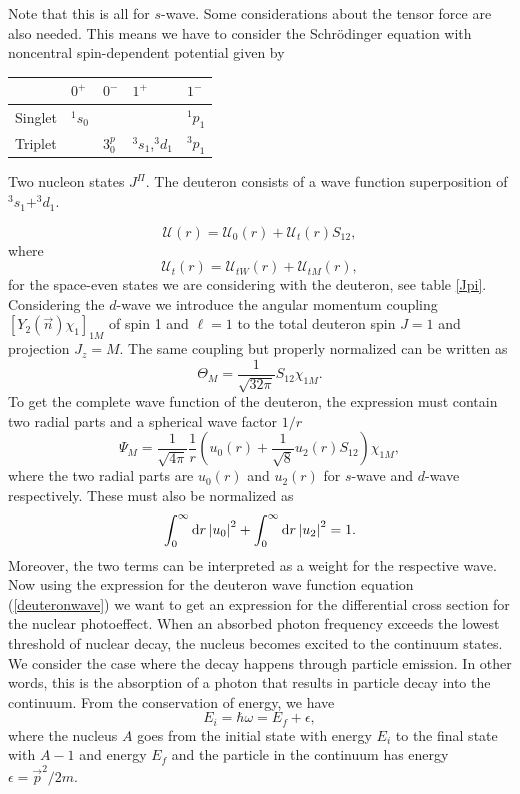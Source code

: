 Note that this is all for $s$-wave. Some considerations about the tensor force are also needed. This means we have to consider the Schrödinger equation with noncentral spin-dependent potential given by
\begin{margintable}
	\label{Jpi}
	\begin{tabular}{lllll}
		\toprule
		& $0^+$     & $0^-$   & $1^+$           & $1^-$   \\ \midrule
		Singlet & $^{1}s_0$ &         &                 & $^1p_1$ \\
		Triplet &           & $3^p_0$ & $^3s_1$,$^3d_1$ & $^3p_1$
	\end{tabular}
	\caption{Two nucleon states $J^\Pi$. The deuteron consists of a wave function superposition of $^3 s_1+^3d_1$.}
\end{margintable}
\begin{equation}
	\mathcal{U}(r) = \mathcal{U}_0(r) + \mathcal{U}_t(r) S_{12},
\end{equation}
where
\begin{equation}
	\mathcal{U}_t (r) = \mathcal{U}_{tW}(r)+\mathcal{U}_{tM}(r),
\end{equation}
for the space-even states we are considering with the deuteron, see table \ref{Jpi}. Considering the $d$-wave we introduce the angular momentum coupling $[Y_2(\vec{n})\chi_1]_{1M}$ of spin 1 and $\ell=1$ to the total deuteron spin $J=1$ and projection $J_z = M$. The same coupling but properly normalized can be written as
\begin{equation}
	\Theta_M = \frac{1}{\sqrt{32\pi}} S_{12}\chi_{1M}.
\end{equation}
To get the complete wave function of the deuteron, the expression must contain two radial parts and a spherical wave factor $1/r$
\begin{equation}\label{deuteronwave}
	\Psi_M = \frac{1}{\sqrt{4\pi}} \frac{1}{r} \left( u_0(r)+\frac{1}{\sqrt{8}}u_2(r)S_{12}\right)\chi_{1M},
\end{equation}
where the two radial parts are $u_0(r)$ and $u_2(r)$ for $s$-wave and $d$-wave respectively. These must also be normalized as
\begin{equation}
	\int_0^\infty \textrm{d}r \, \abs{u_0}^2 + \int_0^\infty \textrm{d}r \, \abs{u_2}^2 = 1.
\end{equation}
Moreover, the two terms can be interpreted as a weight for the respective wave. Now using the expression for the deuteron wave function equation (\ref{deuteronwave}) we want to get an expression for the differential cross section for the nuclear photoeffect. When an absorbed photon frequency exceeds the lowest threshold of nuclear decay, the nucleus becomes excited to the continuum states. We consider the case where the decay happens through particle emission. In other words, this is the absorption of a photon that results in particle decay into the continuum. From the conservation of energy, we have
\begin{equation}
	E_i = \hbar \omega = E_f + \epsilon,
\end{equation}
where the nucleus $A$ goes from the initial state with energy $E_i$ to the final state with $A-1$ and energy $E_f$ and the particle in the continuum has energy $\epsilon = \vec{p}^2/2m$. 

